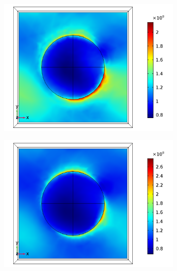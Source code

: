 \begin{figure}[htb!]  
    \begin{subfigure}{0.32\textwidth}    %
        \centering
        \includegraphics[width=\linewidth]{figures/ch4/S5A/FieldDistribution/phi25/Sample5A_TE_Slice@z=0_wl=230_phi=25.png}
   \end{subfigure}
   \begin{subfigure}{0.32\textwidth}
        \centering
        \includegraphics[width=\linewidth]{figures/ch4/S5A/FieldDistribution/phi25/Sample5A_TE_Slice@z=0_wl=255_phi=25.png}
   \end{subfigure}
   \begin{subfigure}{0.32\textwidth}

\end{subfigure}
\end{figure}
